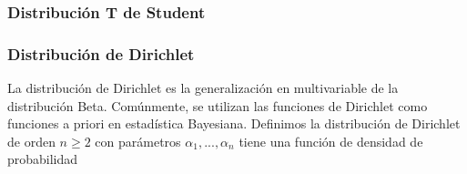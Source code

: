 \documentclass{article}
\begin{document}
\begin{comment}
\begin{definition}
    Sea $\mu \in \mathbb{R}$ y $\sigma > 0$. Definimos la distribución de Laplace, y la denotamos $Laplace(x | \mu, \sigma)$ como la distribución que tiene función de densidad
    \[f(x | \mu, \sigma) = \frac{1}{2 \sigma} e^{-|x - \mu| / \sigma}, \ x \in \mathbb{R}.\]
\end{definition}

\begin{figure}[H]
    \begin{tikzpicture}[
         declare function={gauss(\x,\mu,\sigma)=1/(\sigma*sqrt(2*pi))*exp(-((\x-\mu)^2)/(2*\sigma^2));},
         declare function={laplace(\x,\mu,\sigma) = exp(-abs(\x-\mu) / \sigma)/(2*\sigma);}
        ]
        \begin{axis}[
            domain=-5:5,
            samples=200,
            axis lines=left,
            every axis y label/.style={at=(current axis.above origin),anchor=east},
            every axis x label/.style={at=(current axis.right of origin),anchor=north},
            height=6cm, width=12cm,
            enlargelimits=false,
            clip=false,
            axis on top,
            grid = major,
            legend pos=outer north east
        ]
            \addplot [very thick,cyan!70!black] {laplace(x,0,1)};
            \addlegendentry{Laplace, $\mu = 0, q = 1$}
            \addplot [very thick,cyan!40!black] {laplace(x,0,2)};
            \addlegendentry{Laplace, $\mu = 0, q = 2$}
            \addplot [very thick,magenta!80!black] {gauss(x,0,1)};
            \addlegendentry{Normal, $\mu = 0, q = 1$}
        \end{axis}
    \end{tikzpicture}
    \caption{Densidad de la distribución de Laplace comparada con la densidad de la distribución normal.}
    \label{fig:laplace}
\end{figure}

\end{comment}

\subsubsection{Distribución T de Student}

\subsubsection{Distribución de Dirichlet}
		La distribución de Dirichlet es la generalización en multivariable de la distribución Beta. Comúnmente, se utilizan las funciones de Dirichlet como funciones a priori en estadística Bayesiana. Definimos la distribución de Dirichlet de orden $n \geq 2$ con parámetros $\alpha_1, ..., \alpha_n$ tiene una función de densidad de probabilidad
\end{document}
